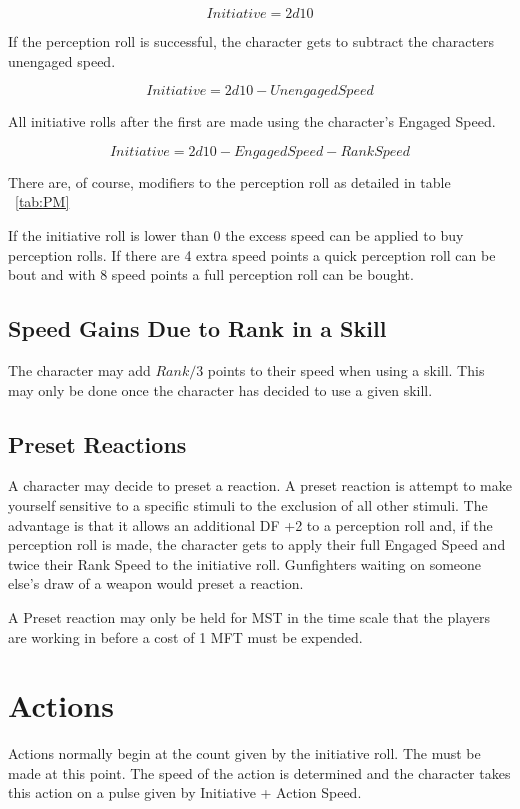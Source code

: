 \[{Initiative} = 2d10\]

If the perception roll is successful, the character gets to subtract
the characters unengaged speed.

\[{Initiative} = 2d10 - {Unengaged Speed}\]

All initiative rolls after the first are made using the character's Engaged Speed.

\[{Initiative} = 2d10 - {Engaged Speed} - {Rank Speed}\] 

There are, of course, modifiers to the perception roll as detailed in table 
~\ref{tab:PM}

If the initiative roll is lower than 0 the excess speed can be applied to 
buy perception rolls. If there are 4 extra speed points a quick perception roll
can be bout and with 8 speed points a full perception roll can be bought.

\subsection{Speed Gains Due to Rank in a Skill}

The character may add \( Rank/3 \) points to their speed when using a
skill. This may only be done once the character has decided to use a
given skill. 

\subsection{Preset Reactions}

A character may decide to preset a reaction. A preset reaction is 
attempt to make yourself sensitive to a specific stimuli to the exclusion
of all other stimuli. The advantage is that it allows an additional DF +2 
to a perception roll and, if the perception roll is made, the character gets
to apply their full Engaged Speed and twice their Rank Speed to the 
initiative roll. Gunfighters waiting on someone else's 
draw of a weapon would preset a reaction. 

A Preset reaction may only be held for MST in the time scale 
that the players are working in before a cost of 1 MFT must be 
expended.

\section{Actions}

Actions normally begin at the count given by the initiative roll. The 
must be made at this point. The speed of the action is determined and 
the character takes this action on a pulse given by Initiative +
Action Speed.  


